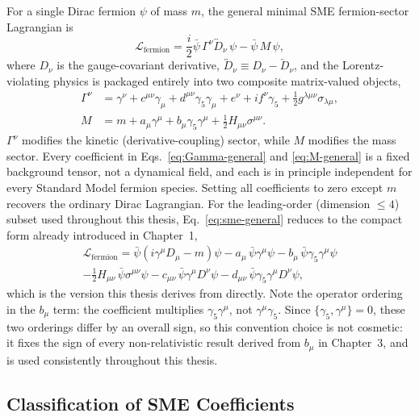 \documentclass[main]{subfiles}
\begin{document}
For a single Dirac fermion $\psi$ of mass $m$, the general minimal SME
fermion-sector Lagrangian is
\begin{equation}
  \mathcal L_{\mathrm{fermion}}
  = \frac{i}{2}\bar\psi\,\Gamma^\nu\overleftrightarrow{D}_\nu\,\psi
  - \bar\psi\,M\,\psi, \label{eq:sme-general}
\end{equation}
where $D_\nu$ is the gauge-covariant derivative,
$\overleftrightarrow{D}_\nu \equiv D_\nu - \overleftarrow{D}_\nu$, and the
Lorentz-violating physics is packaged entirely into two composite
matrix-valued objects,
\begin{align}
  \Gamma^\nu &= \gamma^\nu + c^{\mu\nu}\gamma_\mu + d^{\mu\nu}\gamma_5\gamma_\mu
               + e^\nu + if^\nu\gamma_5 + \tfrac12 g^{\lambda\mu\nu}\sigma_{\lambda\mu},
               \label{eq:Gamma-general} \\
  M &= m + a_\mu\gamma^\mu + b_\mu\gamma_5\gamma^\mu + \tfrac12 H_{\mu\nu}\sigma^{\mu\nu}.
      \label{eq:M-general}
\end{align}
$\Gamma^\nu$ modifies the kinetic (derivative-coupling) sector, while $M$
modifies the mass sector. Every coefficient in Eqs.~\eqref{eq:Gamma-general}
and \eqref{eq:M-general} is a fixed background tensor, not a dynamical
field, and each is in principle independent for every Standard Model fermion
species. Setting all coefficients to zero except $m$ recovers the ordinary
Dirac Lagrangian. For the leading-order (dimension $\leq4$) subset used
throughout this thesis, Eq.~\eqref{eq:sme-general} reduces to the compact
form already introduced in Chapter~1,
\begin{multline}
  \mathcal L_{\mathrm{fermion}}
  = \bar\psi\left(i\gamma^\mu D_\mu - m\right)\psi
  - a_\mu\,\bar\psi\gamma^\mu\psi
  - b_\mu\,\bar\psi\gamma_5\gamma^\mu\psi \\
  - \tfrac12 H_{\mu\nu}\,\bar\psi\sigma^{\mu\nu}\psi
  - c_{\mu\nu}\,\bar\psi\gamma^\mu D^\nu\psi
  - d_{\mu\nu}\,\bar\psi\gamma_5\gamma^\mu D^\nu\psi,
  \label{eq:sme-minimal}
\end{multline}
which is the version this thesis derives from directly. Note the operator
ordering in the $b_\mu$ term: the coefficient multiplies
$\gamma_5\gamma^\mu$, not $\gamma^\mu\gamma_5$. Since $\{\gamma_5,\gamma^\mu\}=0$,
these two orderings differ by an overall sign, so this convention choice is
not cosmetic: it fixes the sign of every non-relativistic result derived
from $b_\mu$ in Chapter~3, and is used consistently throughout this thesis.

\subsection{Classification of SME Coefficients}
\end{document}
